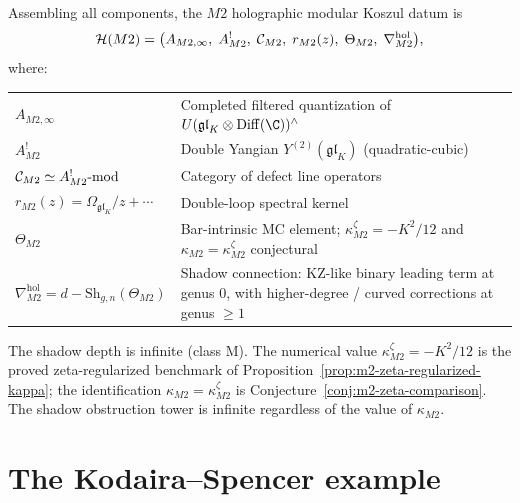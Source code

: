 \begin{computation}
Assembling all components, the $M2$ holographic modular Koszul
datum is
\begin{equation}%
\mathcal{H}(M2)
= \bigl(
A_{M2,\infty},\;
A^!_{M2},\;
\cC_{M2},\;
r_{M2}(z),\;
\Theta_{M2},\;
\nabla^{\mathrm{hol}}_{M2}
\bigr),
\end{equation}
where:
\begin{center}
\renewcommand{\arraystretch}{1.25}
\begin{tabular}{lp{9cm}}
\hline
$A_{M2,\infty}$ & Completed filtered quantization of
$U(\mathfrak{gl}_K\otimes\Diff(\C))^{\wedge}$ \\
$A^!_{M2}$ & Double Yangian
$Y^{(2)}(\mathfrak{gl}_K)$ (quadratic-cubic) \\
$\mathcal C_{M2}\simeq A^!_{M2}\text{-mod}$
& Category of defect line operators \\
$r_{M2}(z)=\Omega_{\mathfrak{gl}_K}/z+\cdots$
& Double-loop spectral kernel \\
$\Theta_{M2}$ & Bar-intrinsic MC element;
$\kappa_{M2}^{\zeta}=-K^2/12$ and
$\kappa_{M2}=\kappa_{M2}^{\zeta}$ conjectural \\
$\nabla^{\mathrm{hol}}_{M2}
= d - \mathrm{Sh}_{g,n}(\Theta_{M2})$
& Shadow connection: KZ-like binary leading term at genus $0$,
with higher-degree / curved corrections at genus $\ge 1$ \\
\hline
\end{tabular}
\end{center}
The shadow depth is infinite (class M). The numerical value
\(\kappa_{M2}^{\zeta}=-K^2/12\) is the proved zeta-regularized
benchmark of Proposition~\ref{prop:m2-zeta-regularized-kappa};
the identification \(\kappa_{M2}=\kappa_{M2}^{\zeta}\) is
Conjecture~\ref{conj:m2-zeta-comparison}.  The shadow obstruction
tower is infinite regardless of the value of \(\kappa_{M2}\).
\end{computation}




\section{The Kodaira--Spencer example}

